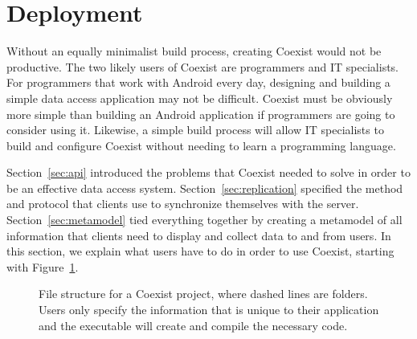 \section{Deployment} \label{sec:deployment}

Without an equally minimalist build process, creating Coexist would not be
productive. The two likely users of Coexist are programmers and IT specialists.
For programmers that work with Android every day, designing and building a
simple data access application may not be difficult. Coexist must be obviously
more simple than building an Android application if programmers are going
to consider using it. Likewise, a simple build process will allow IT specialists
to build and configure Coexist without needing to learn a programming language.

Section~\ref{sec:api} introduced the problems that Coexist needed to solve in
order to be an effective data access system. Section~\ref{sec:replication}
specified the method and protocol that clients use to synchronize themselves
with the server. Section~\ref{sec:metamodel} tied everything together by
creating a metamodel of all information that clients need to display and collect
data to and from users. In this section, we explain what users have to do in
order to use Coexist, starting with Figure~\ref{fig:coexist_project}.



\usetikzlibrary{trees}
\begin{figure}[h!]
\centering
{}
\caption{File structure for a Coexist project, where dashed lines are folders.
Users only specify the information that is unique to their application and the
 executable will create and compile the necessary code.}
\label{fig:coexist_project}
\end{figure}


